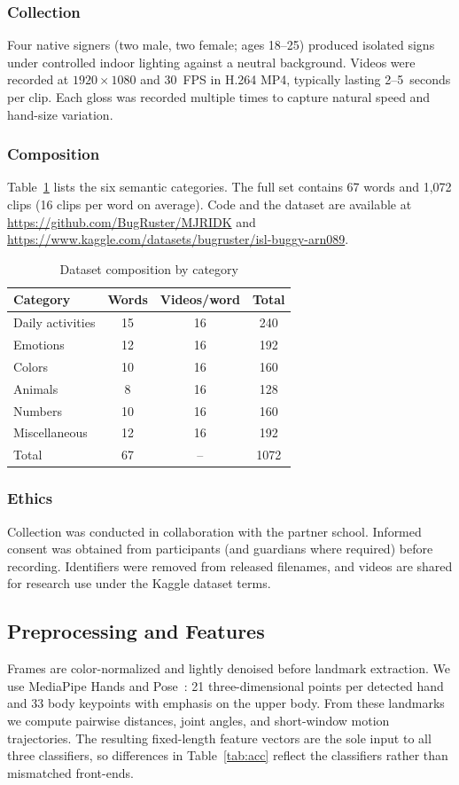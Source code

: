 \documentclass[conference]{IEEEtran}
\begin{document}
\subsubsection{Collection}
Four native signers (two male, two female; ages 18--25) produced isolated signs under controlled indoor lighting against a neutral background. Videos were recorded at $1920\times1080$ and 30~FPS in H.264 MP4, typically lasting 2--5~seconds per clip. Each gloss was recorded multiple times to capture natural speed and hand-size variation.

\subsubsection{Composition}
Table~\ref{tab:dataset} lists the six semantic categories. The full set contains 67 words and 1{,}072 clips (16 clips per word on average). Code and the dataset are available at \url{https://github.com/BugRuster/MJRIDK} and \url{https://www.kaggle.com/datasets/bugruster/isl-buggy-arn089}.

\begin{table}[t]
\centering
\caption{Dataset composition by category}
\label{tab:dataset}
\begin{tabular}{@{}lccc@{}}
\toprule
Category & Words & Videos/word & Total \\
\midrule
Daily activities & 15 & 16 & 240 \\
Emotions & 12 & 16 & 192 \\
Colors & 10 & 16 & 160 \\
Animals & 8 & 16 & 128 \\
Numbers & 10 & 16 & 160 \\
Miscellaneous & 12 & 16 & 192 \\
\midrule
Total & 67 & -- & 1072 \\
\bottomrule
\end{tabular}
\end{table}

\subsubsection{Ethics}
Collection was conducted in collaboration with the partner school. Informed consent was obtained from participants (and guardians where required) before recording. Identifiers were removed from released filenames, and videos are shared for research use under the Kaggle dataset terms.

\subsection{Preprocessing and Features}
Frames are color-normalized and lightly denoised before landmark extraction. We use MediaPipe Hands and Pose~\cite{lugaresi2019}: 21 three-dimensional points per detected hand and 33 body keypoints with emphasis on the upper body. From these landmarks we compute pairwise distances, joint angles, and short-window motion trajectories. The resulting fixed-length feature vectors are the sole input to all three classifiers, so differences in Table~\ref{tab:acc} reflect the classifiers rather than mismatched front-ends.
\end{document}
